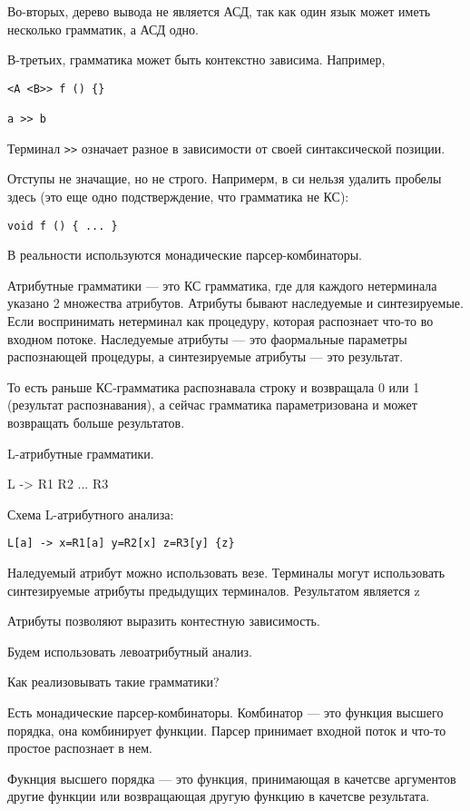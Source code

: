 Во-вторых, дерево вывода не является АСД, так как один язык может иметь
несколько грамматик, а АСД одно.

В-третьих, грамматика может быть контекстно зависима. Например,
\begin{verbatim}
<A <B>> f () {}

a >> b
\end{verbatim}
Терминал \texttt{>>} означает разное в зависимости от своей синтаксической
позиции.

Отступы не значащие, но не строго. Напримерм, в си нельзя удалить пробелы
здесь (это еще одно подстверждение, что грамматика не КС):
\begin{verbatim}
void f () { ... }
\end{verbatim}

В реальности используются монадические парсер-комбинаторы.

Атрибутные грамматики --- это КС грамматика, где для каждого нетерминала
указано 2 множества атрибутов. Атрибуты бывают наследуемые и синтезируемые.
Если воспринимать нетерминал как процедуру, которая распознает что-то во
входном потоке. Наследуемые атрибуты --- это фаормальные параметры распознающей
процедуры, а синтезируемые атрибуты --- это результат.

То есть раньше КС-грамматика распознавала строку и возвращала 0 или 1
(результат распознавания), а сейчас грамматика параметризована и может
возвращать больше результатов.

L-атрибутные грамматики.

L -> R1 R2 ... R3 

Схема L-атрибутного анализа:
\begin{verbatim}
L[a] -> x=R1[a] y=R2[x] z=R3[y] {z}
\end{verbatim}

Наледуемый атрибут можно использовать везе. Терминалы могут использовать
синтезируемые атрибуты предыдущих терминалов. Результатом является z

Атрибуты позволяют выразить контестную зависимость.

Будем использовать левоатрибутный анализ.

Как реализовывать такие грамматики?

Есть монадические парсер-комбинаторы. Комбинатор --- это функция высшего
порядка, она комбинирует функции. Парсер принимает входной поток и что-то
простое распознает в нем.

Фукнция высшего порядка --- это функция, принимающая в качетсве аргументов
другие функции или возвращающая другую функцию в качетсве результата.

